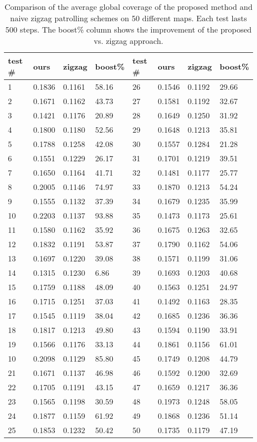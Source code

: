\documentclass{article}
\begin{document}
\begin{table}[]
	\centering
	\caption{Comparison of the average global coverage of the proposed method and naive zigzag patrolling schemes on 50 different maps. Each test lasts 500 steps. The boost\% column shows the improvement of the proposed vs. zigzag approach.}
		\label{tab:patrolcomparison}
		\begin{tabular}{llll|llll}
			\toprule
			test \# & ours   & zigzag & boost\% & test \# & ours   & zigzag & boost\% \\ \midrule
			1   & 0.1836 & 0.1161 &58.16    & 26  &0.1546 & 0.1192 &29.66 \\
			2   & 0.1671 &0.1162  &43.73    &27   &0.1581 & 0.1192 &32.67 \\
			3   & 0.1421 &0.1176  &20.89    &28   &0.1649 &0.1250 &31.92 \\
			4   & 0.1800 &0.1180  &52.56    &29   &0.1648 &0.1213 &35.81 \\
			5   & 0.1788 &0.1258  &42.08    &30   &0.1557 &0.1284 &21.28 \\
			6   & 0.1551 &0.1229  &26.17    &31   &0.1701 &0.1219 &39.51 \\ 
			7   & 0.1650 &0.1164  &41.71    &32   &0.1481 &0.1177 &25.77 \\
			8   & 0.2005 &0.1146  &74.97    &33   &0.1870 &0.1213 &54.24 \\
			9   & 0.1555 &0.1132  &37.39    &34   &0.1679 &0.1235 &35.99 \\ 
			10  & 0.2203 &0.1137  &93.88    &35   &0.1473 &0.1173 &25.61 \\
			11  & 0.1580 &0.1162  &35.92    &36   &0.1675 &0.1263 &32.65 \\
			12  & 0.1832 &0.1191  &53.87    &37   &0.1790 &0.1162 &54.06 \\
			13  & 0.1697 &0.1220  &39.08    &38   &0.1571 &0.1199 &31.06 \\ 
			14  & 0.1315 &0.1230  &6.86     &39   &0.1693 &0.1203 &40.68 \\
			15  & 0.1759 &0.1188  &48.09    &40   &0.1563 &0.1251 &24.97 \\
			16  & 0.1715 &0.1251  &37.03    &41   &0.1492 &0.1163 &28.35 \\
			17  & 0.1545 &0.1119  &38.04    &42   &0.1685 &0.1236 &36.36 \\
			18  & 0.1817 &0.1213  &49.80    &43   &0.1594 &0.1190 &33.91 \\
			19  & 0.1566 &0.1176  &33.13    &44   &0.1861 &0.1156 &61.01 \\
			10  & 0.2098 &0.1129  &85.80    &45   &0.1749 &0.1208 &44.79 \\
			21  & 0.1671 &0.1137  &46.98    &46   &0.1592 &0.1200 &32.69 \\
			22  & 0.1705 &0.1191  &43.15    &47   &0.1659 &0.1217 &36.36 \\
			23  & 0.1565 &0.1198  &30.59    &48   &0.1973 &0.1248 &58.05 \\
			24  & 0.1877 &0.1159  &61.92    &49   &0.1868 &0.1236 &51.14 \\
			25  & 0.1853 &0.1232  &50.42    &50   &0.1735 &0.1179 &47.19 \\	%
	\end{tabular}
\end{table}
\end{document}
